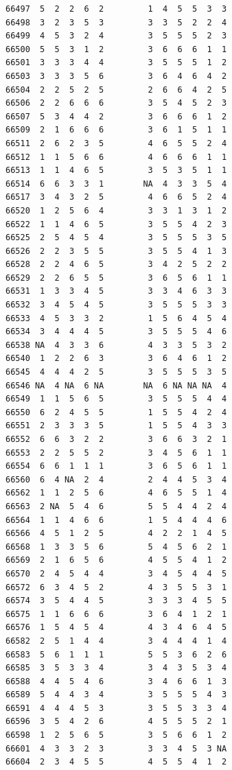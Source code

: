 \documentclass[
  letterpaper,
  DIV=11,
  numbers=noendperiod]{scrreprt}
\begin{document}
\begin{verbatim}
66497  5  2  2  6  2         1  4  5  5  3  3
66498  3  2  3  5  3         3  3  5  2  2  4
66499  4  5  3  2  4         3  5  5  5  2  3
66500  5  5  3  1  2         3  6  6  6  1  1
66501  3  3  3  4  4         3  5  5  5  1  2
66503  3  3  3  5  6         3  6  4  6  4  2
66504  2  2  5  2  5         2  6  6  4  2  5
66506  2  2  6  6  6         3  5  4  5  2  3
66507  5  3  4  4  2         3  6  6  6  1  2
66509  2  1  6  6  6         3  6  1  5  1  1
66511  2  6  2  3  5         4  6  5  5  2  4
66512  1  1  5  6  6         4  6  6  6  1  1
66513  1  1  4  6  5         3  5  3  5  1  1
66514  6  6  3  3  1        NA  4  3  3  5  4
66517  3  4  3  2  5         4  6  6  5  2  4
66520  1  2  5  6  4         3  3  1  3  1  2
66522  1  1  4  6  5         3  5  5  4  2  3
66525  2  5  4  5  4         3  5  5  5  3  5
66526  2  2  3  5  5         3  5  5  4  1  3
66528  2  2  4  6  5         3  4  2  5  2  2
66529  2  2  6  5  5         3  6  5  6  1  1
66531  1  3  3  4  5         3  3  4  6  3  3
66532  3  4  5  4  5         3  5  5  5  3  3
66533  4  5  3  3  2         1  5  6  4  5  4
66534  3  4  4  4  5         3  5  5  5  4  6
66538 NA  4  3  3  6         4  3  3  5  3  2
66540  1  2  2  6  3         3  6  4  6  1  2
66545  4  4  4  2  5         3  5  5  5  3  5
66546 NA  4 NA  6 NA        NA  6 NA NA NA  4
66549  1  1  5  6  5         3  5  5  5  4  4
66550  6  2  4  5  5         1  5  5  4  2  4
66551  2  3  3  3  5         1  5  5  4  3  3
66552  6  6  3  2  2         3  6  6  3  2  1
66553  2  2  5  5  2         3  4  5  6  1  1
66554  6  6  1  1  1         3  6  5  6  1  1
66560  6  4 NA  2  4         2  4  4  5  3  4
66562  1  1  2  5  6         4  6  5  5  1  4
66563  2 NA  5  4  6         5  5  4  4  2  4
66564  1  1  4  6  6         1  5  4  4  4  6
66566  4  5  1  2  5         4  2  2  1  4  5
66568  1  3  3  5  6         5  4  5  6  2  1
66569  2  1  6  5  6         4  5  5  4  1  2
66570  2  4  5  4  4         3  4  5  4  4  5
66572  6  3  4  5  2         4  3  5  5  3  1
66574  3  5  4  4  5         3  3  3  4  5  5
66575  1  1  6  6  6         3  6  4  1  2  1
66576  1  5  4  5  4         4  3  4  6  4  5
66582  2  5  1  4  4         3  4  4  4  1  4
66583  5  6  1  1  1         5  5  3  6  2  6
66585  3  5  3  3  4         3  4  3  5  3  4
66588  4  4  5  4  6         3  4  6  6  1  3
66589  5  4  4  3  4         3  5  5  5  4  3
66591  4  4  4  5  3         3  5  5  3  3  4
66596  3  5  4  2  6         4  5  5  5  2  1
66598  1  2  5  6  5         3  5  6  6  1  2
66601  4  3  3  2  3         3  3  4  5  3 NA
66604  2  3  4  5  5         4  5  5  4  1  2

\end{verbatim}
\end{document}
